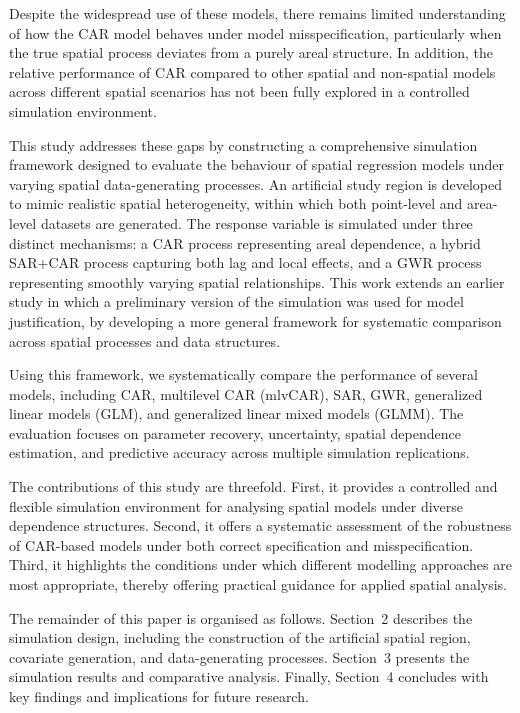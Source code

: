 \documentclass[a4paper,reqno]{amsart}
\begin{document}
Despite the widespread use of these models, there remains limited
understanding of how the CAR model behaves under model misspecification,
particularly when the true spatial process deviates from a purely areal
structure. In addition, the relative performance of CAR compared to
other spatial and non-spatial models across different spatial
scenarios has not been fully explored in a controlled simulation
environment.

This study addresses these gaps by constructing a comprehensive
simulation framework designed to evaluate the behaviour of spatial
regression models under varying spatial data-generating processes. An
artificial study region is developed to mimic realistic spatial
heterogeneity, within which both point-level and area-level datasets
are generated. The response variable is simulated under three distinct
mechanisms: a CAR process representing areal dependence, a hybrid
SAR+CAR process capturing both lag and local effects, and a GWR process
representing smoothly varying spatial relationships. This work extends an earlier 
study \cite{kinasih2025conditionally} in which a preliminary version of the simulation was used for model 
justification, by developing a more general framework for systematic comparison 
across spatial processes and data structures.

Using this framework, we systematically compare the performance of
several models, including CAR, multilevel CAR (mlvCAR), SAR, GWR,
generalized linear models (GLM), and generalized linear mixed models
(GLMM). The evaluation focuses on parameter recovery, uncertainty,
spatial dependence estimation, and predictive accuracy across multiple
simulation replications.

The contributions of this study are threefold. First, it provides a
controlled and flexible simulation environment for analysing spatial
models under diverse dependence structures. Second, it offers a
systematic assessment of the robustness of CAR-based models under both
correct specification and misspecification. Third, it highlights the
conditions under which different modelling approaches are most
appropriate, thereby offering practical guidance for applied spatial
analysis.

The remainder of this paper is organised as follows. Section~2
describes the simulation design, including the construction of the
artificial spatial region, covariate generation, and data-generating
processes. Section~3 presents the simulation results and comparative
analysis. Finally, Section~4 concludes with key findings and
implications for future research.
\end{document}
